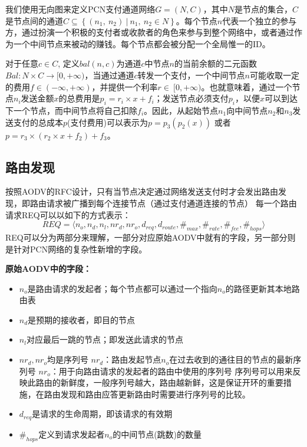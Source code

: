 \documentclass[12pt,a4paper]{article}
\begin{document}
我们使用无向图来定义PCN支付通道网络$G=(N,C)$，其中$N$是节点的集合，$C$是节点间的通道$C\subseteq \left\{(n_1,\ n_2)\ |\ n_1,\ n_2\in N\right\}$。每个节点$n$代表一个独立的参与方，通过扮演一个积极的支付者或收款者的角色来参与到整个网络中，或者通过作为一个中间节点来被动的赚钱。每个节点都会被分配一个全局惟一的ID。

对于任意$c\in C$, 定义$bal(n,c)$为通道$c$中节点$n$的当前余额的二元函数$Bal: N\times C\rightarrow[0,+\infty)$，当通过通道$c$转发一个支付，一个中间节点$n$可能收取一定的费用$f\in(-\infty,+\infty)$，并提供一个利率$r\in\ [0,+\infty)$。也就意味着，通过一个节点$n_i$发送金额$x$的总费用是$p_i=r_i\times x+f_i$；发送节点必须支付$p_i$，以便$x$可以到达下一个节点，而中间节点将自己扣除$f_i$。因此，从起始节点$n_1$向中间节点$n_2$和$n_3$发送支付的总成本$p$(支付费用)可以表示为$p=p_3(p_2(x))$ 或者$p=r_3\times\left(r_2\times x+f_2\right)+f_3$。

\subsection{路由发现}
按照AODV的RFC设计，只有当节点决定通过网络发送支付时才会发出路由发现，即路由请求被广播到每个连接节点（通过支付通道连接的节点）
每一个路由请求REQ可以以如下的方式表示：
\begin{equation}
REQ=\langle n_o, n_d, n_l, {nr}_d, {nr}_o, d_{req},d_{route},\#_{max},\#_{rate},\#_{fee},\#_{hops}\rangle
\end{equation}
REQ可以分为两部分来理解，一部分对应原始AODV中就有的字段，另一部分则是针对PCN网络的复杂性新增的字段。

\textbf{原始AODV中的字段：}
\begin{itemize}
	\item $n_o$是路由请求的发起者；每个节点都可以通过一个指向$n_o$的路径更新其本地路由表
	\item $n_d$是预期的接收者，即目的节点
	\item $n_l$对应最后一跳的节点；即发送此请求的节点
	\item ${nr}_d, {nr}_o$均是序列号
	\iitem ${nr}_d$：路由发起节点$n_o$在过去收到的通往目的节点的最新序列号
	\iitem ${nr}_o$：用于向路由请求的发起者的路由中使用的序列号
	序列号可以用来反映此路由的新鲜度，一般序列号越大，路由越新鲜，这是保证开环的重要措施，在路由发现和路由应答更新路由时需要进行序列号的比较。
	\item $d_{req}$是请求的生命周期，即该请求的有效期
	\item $\#_{hops}$定义到请求发起者$n_o$的中间节点(跳数)的数量
\end{itemize}
\end{document}
